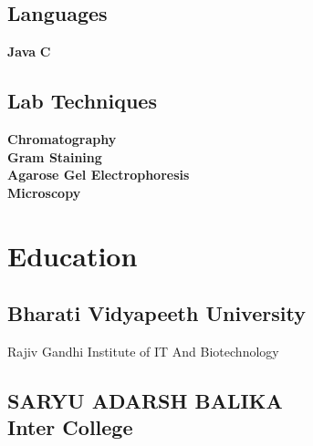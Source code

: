 \documentclass[]{dhirendra-pratap-singh-resume}
\begin{document}
\begin{minipage}[t]{0.33\textwidth}
\subsection{}
\subsection{Languages}
 \textbullet{} \textbf{Java} \textbullet{} \textbf{C}

\subsection{}
{\subsection{Lab Techniques}}
{
\textbullet{} \textbf{Chromatography} \\
\textbullet{} \textbf{Gram Staining} \\
\textbullet{} \textbf{Agarose Gel Electrophoresis} \\
\textbullet{} \textbf{Microscopy}
}

% 

\sectionsep

\section{Education}

\subsection{Bharati Vidyapeeth University}
Rajiv Gandhi Institute of IT And Biotechnology\\
\sectionsep

\subsection{SARYU ADARSH BALIKA \\ Inter College}
\sectionsep


\end{minipage}
\end{document}
